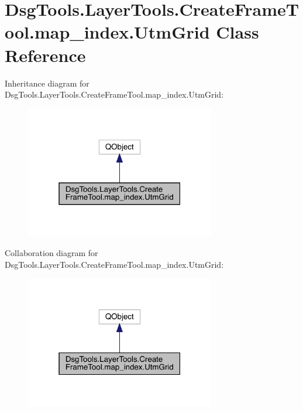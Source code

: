 \hypertarget{class_dsg_tools_1_1_layer_tools_1_1_create_frame_tool_1_1map__index_1_1_utm_grid}{}\section{Dsg\+Tools.\+Layer\+Tools.\+Create\+Frame\+Tool.\+map\+\_\+index.\+Utm\+Grid Class Reference}
\label{class_dsg_tools_1_1_layer_tools_1_1_create_frame_tool_1_1map__index_1_1_utm_grid}


Inheritance diagram for Dsg\+Tools.\+Layer\+Tools.\+Create\+Frame\+Tool.\+map\+\_\+index.\+Utm\+Grid\+:
\nopagebreak
\begin{figure}[H]
\begin{center}
\leavevmode
\includegraphics[width=235pt]{class_dsg_tools_1_1_layer_tools_1_1_create_frame_tool_1_1map__index_1_1_utm_grid__inherit__graph}
\end{center}
\end{figure}


Collaboration diagram for Dsg\+Tools.\+Layer\+Tools.\+Create\+Frame\+Tool.\+map\+\_\+index.\+Utm\+Grid\+:
\nopagebreak
\begin{figure}[H]
\begin{center}
\leavevmode
\includegraphics[width=235pt]{class_dsg_tools_1_1_layer_tools_1_1_create_frame_tool_1_1map__index_1_1_utm_grid__coll__graph}
\end{center}
\end{figure}
